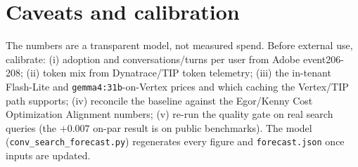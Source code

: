 \documentclass[11pt]{article}
\newcommand{\code}[1]{\texttt{\small #1}}
\begin{document}
\section{Caveats and calibration}
The numbers are a transparent model, not measured spend. Before external use, calibrate:
(i) adoption and conversations/turns per user from Adobe event206-208; (ii) token mix from
Dynatrace/TIP token telemetry; (iii) the in-tenant Flash-Lite and \code{gemma4:31b}-on-Vertex
prices and which caching the Vertex/TIP path supports; (iv) reconcile the baseline against the
Egor/Kenny Cost Optimization Alignment numbers; (v) re-run the quality gate on real search
queries (the $+0.007$ on-par result is on public benchmarks). The model
(\code{conv\_search\_forecast.py}) regenerates every figure and \code{forecast.json} once inputs
are updated.
\end{document}
